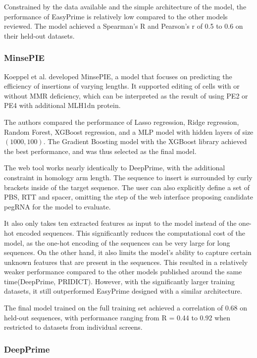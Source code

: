 Constrained by the data available and the simple architecture of the model, the performance of EasyPrime is relatively low compared to the other models reviewed. The model achieved a Spearman's R and Pearson's r of 0.5 to 0.6 on their held-out datasets.

\subsubsection{MinsePIE}

\label{sec:minsepie}

Koeppel et al. developed MinsePIE, a model that focuses on predicting the efficiency of insertions of varying lengths. It supported editing of cells with or without MMR deficiency, which can be interpreted as the result of using PE2 or PE4 with additional MLH1dn protein. 

The authors compared the performance of Lasso regression, Ridge regression, Random Forest, XGBoost regression, and a MLP model with hidden layers of size $(1000, 100)$. The Gradient Boosting model with the XGBoost library achieved the best performance, and was thus selected as the final model. 

The web tool works nearly identically to DeepPrime, with the additional constraint in homology arm length. The sequence to insert is surrounded by curly brackets inside of the target sequence. The user can also explicitly define a set of PBS, RTT and spacer, omitting the step of the web interface proposing candidate pegRNA for the model to evaluate. 

It also only takes ten extracted features as input to the model instead of the one-hot encoded sequences. This significantly reduces the computational cost of the model, as the one-hot encoding of the sequences can be very large for long sequences. On the other hand, it also limits the model's ability to capture certain unknown features that are present in the sequences. This resulted in a relatively weaker performance compared to the other models published around the same time(DeepPrime, PRIDICT). However, with the significantly larger training datasets, it still outperformed EasyPrime designed with a similar architecture.

The final model trained on the full training set achieved a correlation of 0.68 on held-out sequences, with performance ranging from R = 0.44 to 0.92 when restricted to datasets from individual screens.

\subsubsection{DeepPrime}

